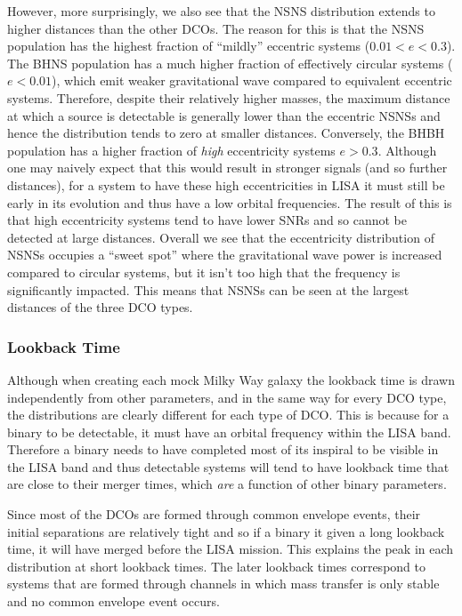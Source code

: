 However, more surprisingly, we also see that the NSNS distribution extends to higher distances than the other DCOs. The reason for this is that the NSNS population has the highest fraction of ``mildly'' eccentric systems ($0.01 < e < 0.3$). The BHNS population has a much higher fraction of effectively circular systems ($e < 0.01$), which emit weaker gravitational wave compared to equivalent eccentric systems. Therefore, despite their relatively higher masses, the maximum distance at which a source is detectable is generally lower than the eccentric NSNSs and hence the distribution tends to zero at smaller distances. Conversely, the BHBH population has a higher fraction of \textit{high} eccentricity systems $e > 0.3$. Although one may naively expect that this would result in stronger signals (and so further distances), for a system to have these high eccentricities in LISA it must still be early in its evolution and thus have a low orbital frequencies. The result of this is that high eccentricity systems tend to have lower SNRs and so cannot be detected at large distances. Overall we see that the eccentricity distribution of NSNSs occupies a ``sweet spot'' where the gravitational wave power is increased compared to circular systems, but it isn't too high that the frequency is significantly impacted. This means that NSNSs can be seen at the largest distances of the three DCO types.

\subsubsection{Lookback Time}
Although when creating each mock Milky Way galaxy the lookback time is drawn independently from other parameters, and in the same way for every DCO type, the distributions are clearly different for each type of DCO. This is because for a binary to be detectable, it must have an orbital frequency within the LISA band. Therefore a binary needs to have completed most of its inspiral to be visible in the LISA band and thus detectable systems will tend to have lookback time that are close to their merger times, which \textit{are} a function of other binary parameters.

Since most of the DCOs are formed through common envelope events, their initial separations are relatively tight and so if a binary it given a long lookback time, it will have merged before the LISA mission. This explains the peak in each distribution at short lookback times. The later lookback times correspond to systems that are formed through channels in which mass transfer is only stable and no common envelope event occurs.

